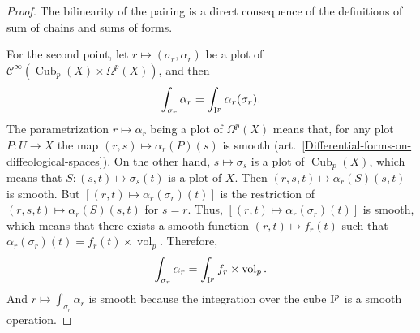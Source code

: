 \documentclass[11pt,reqno]{amsart}
\theoremstyle{definition}
\def \P{{P}}
\def \S{{S}}
\def \U{{U}}
\def \X{{X}}
\newcommand{\cC}{{\mathcal C}}
\newcommand{\art}[1]{{(art.~\ref{#1})}}
\newcommand{\cub}[1]{{\rm I}^{#1}}
\newcommand{\DCubes}[1]{\operatorname{Cub}_{#1}}
\newcommand{\Cinf}{{\cC}^\infty}
\newcommand{\vol}{\operatorname{vol}}
\begin{document}
  \begin{proof}
    The bilinearity of the pairing is a direct
    consequence of the definitions of sum of chains and sums
    of forms.
    
    For the second point, let $r \mapsto (\sigma_r,\alpha_r)$ be a
    plot of $\Cinf(\DCubes{p}(\X) \times \Omega^p(\X))$, and then
    $$
      \int_{\sigma_r} \alpha_r = \int_{\cub{p}}
      \alpha_r(\sigma_r).
      $$
    The parametrization $r \mapsto \alpha_r$ being a plot of $\Omega^p(\X)$
    means that, for any plot $\P: \U \to \X$ the map
    $(r,s) \mapsto  \alpha_r(\P)(s)$ is smooth
    \art{Differential-forms-on-diffeological-spaces}. On the
    other hand, $s \mapsto \sigma_s$ is a plot of
    $\DCubes{p}(\X)$, which means that $\S: (s,t) \mapsto
      \sigma_s(t)$ is a plot of $\X$. Then $(r,s,t) \mapsto
        \alpha_r(\S)(s,t)$ is smooth. But $[(r,t) \mapsto
          \alpha_r(\sigma_r)(t)]$ is the restriction of $(r,s,t)
            \mapsto \alpha_r(\S)(s,t)$ for $s = r$. Thus, $[(r,t)
              \mapsto  \alpha_r(\sigma_r)(t)]$ is smooth, which means
    that there exists a smooth function $(r,t) \mapsto
      f_r(t)$ such that $\alpha_r(\sigma_r)(t)
        = f_r(t) \times \vol_p$. Therefore, $$ \int_{\sigma_r}
          \alpha_r =  \int_{\cub{p}} f_r \times \vol_p. $$ And $r
            \mapsto \int_{\sigma_r} \alpha_r$ is smooth because the
    integration over the cube $\cub{p}$ is a smooth operation.
    

\end{proof}
\end{document}
